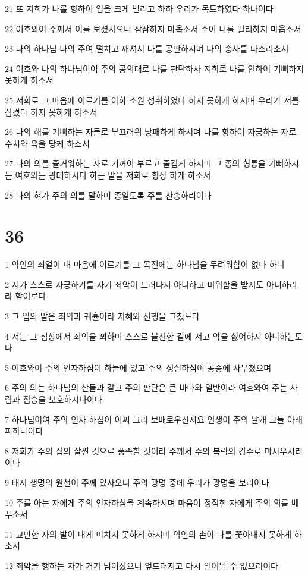 \par 21 또 저희가 나를 향하여 입을 크게 벌리고 하하 우리가 목도하였다 하나이다
\par 22 여호와여 주께서 이를 보셨사오니 잠잠하지 마옵소서 주여 나를 멀리하지 마옵소서
\par 23 나의 하나님 나의 주여 떨치고 깨셔서 나를 공판하시며 나의 송사를 다스리소서
\par 24 여호와 나의 하나님이여 주의 공의대로 나를 판단하사 저희로 나를 인하여 기뻐하지 못하게 하소서
\par 25 저희로 그 마음에 이르기를 아하 소원 성취하였다 하지 못하게 하시며 우리가 저를 삼켰다 하지 못하게 하소서
\par 26 나의 해를 기뻐하는 자들로 부끄러워 낭패하게 하시며 나를 향하여 자긍하는 자로 수치와 욕을 당케 하소서
\par 27 나의 의를 즐거워하는 자로 기꺼이 부르고 즐겁게 하시며 그 종의 형통을 기뻐하시는 여호와는 광대하시다 하는 말을 저희로 항상 하게 하소서
\par 28 나의 혀가 주의 의를 말하며 종일토록 주를 찬송하리이다

\chapter{36}

\par 1 악인의 죄얼이 내 마음에 이르기를 그 목전에는 하나님을 두려워함이 없다 하니
\par 2 저가 스스로 자긍하기를 자기 죄악이 드러나지 아니하고 미워함을 받지도 아니하리라 함이로다
\par 3 그 입의 말은 죄악과 궤휼이라 지혜와 선행을 그쳤도다
\par 4 저는 그 침상에서 죄악을 꾀하며 스스로 불선한 길에 서고 악을 싫어하지 아니하는도다
\par 5 여호와여 주의 인자하심이 하늘에 있고 주의 성실하심이 공중에 사무쳤으며
\par 6 주의 의는 하나님의 산들과 같고 주의 판단은 큰 바다와 일반이라 여호와여 주는 사람과 짐승을 보호하시나이다
\par 7 하나님이여 주의 인자 하심이 어찌 그리 보배로우신지요 인생이 주의 날개 그늘 아래 피하나이다
\par 8 저희가 주의 집의 살찐 것으로 풍족할 것이라 주께서 주의 복락의 강수로 마시우시리이다
\par 9 대저 생명의 원천이 주께 있사오니 주의 광명 중에 우리가 광명을 보리이다
\par 10 주를 아는 자에게 주의 인자하심을 계속하시며 마음이 정직한 자에게 주의 의를 베푸소서
\par 11 교만한 자의 발이 내게 미치지 못하게 하시며 악인의 손이 나를 쫓아내지 못하게 하소서
\par 12 죄악을 행하는 자가 거기 넘어졌으니 엎드러지고 다시 일어날 수 없으리이다

